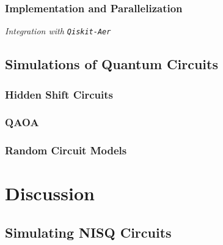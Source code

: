 \subsubsection*{Implementation and Parallelization}
\par
\large{\itshape{Integration with \texttt{Qiskit-Aer}}\par
\par
\subsection{Simulations of Quantum Circuits}
\subsubsection*{Hidden Shift Circuits}
\subsubsection*{QAOA}
\subsubsection*{Random Circuit Models}
\section{Discussion}
\subsection{Simulating NISQ Circuits}
}
